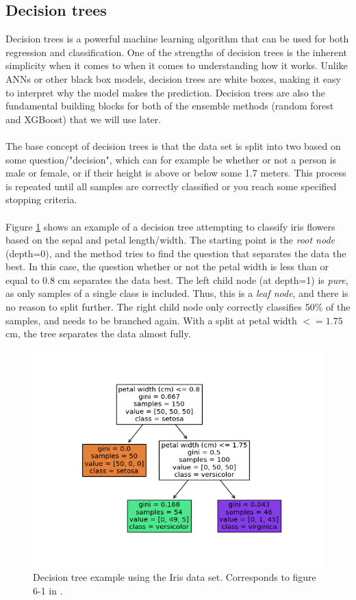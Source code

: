 \documentclass[a4paper]{article}
\begin{document}
\subsection{Decision trees} \label{sec:dec_tree}
Decision trees is a powerful machine learning algorithm that can be used for both regression and classification. One of the strengths of decision trees is the inherent simplicity when it comes to when it comes to understanding how it works. Unlike ANNs or other black box models, decision trees are white boxes, making it easy to interpret why the model makes the prediction. Decision trees are also the fundamental building blocks for both of the ensemble methods (random forest and XGBoost) that we will use later.
\\\\
The base concept of decision trees is that the data set is split into two based on some question/"decision", which can for example be whether or not a person is male or female, or if their height is above or below some 1.7 meters. This process is repeated until all samples are correctly classified or you reach some specified stopping criteria.
\\\\
Figure \ref{fig:iris} shows an example of a decision tree attempting to classify iris flowers based on the sepal and petal length/width. The starting point is the \textit{root node} (depth=0), and the method tries to find the question that separates the data the best. In this case, the question whether or not the petal width is less than or equal to 0.8 cm separates the data best. The left child node (at depth=1) is \textit{pure}, as only samples of a single class is included. Thus, this is a \textit{leaf node}, and there is no reason to split further. The right child node only correctly classifies 50\% of the samples, and needs to be branched again. With a split at petal width $<= 1.75$ cm, the tree separates the data almost fully.
\begin{figure}[H]
	\centering
	\includegraphics[scale=0.8]{../figures/iris_decision_tree.png}
	\caption{Decision tree example using the Iris data set. Corresponds to figure 6-1 in \cite{Geron}.}
	\label{fig:iris}
\end{figure}	
\end{document}
